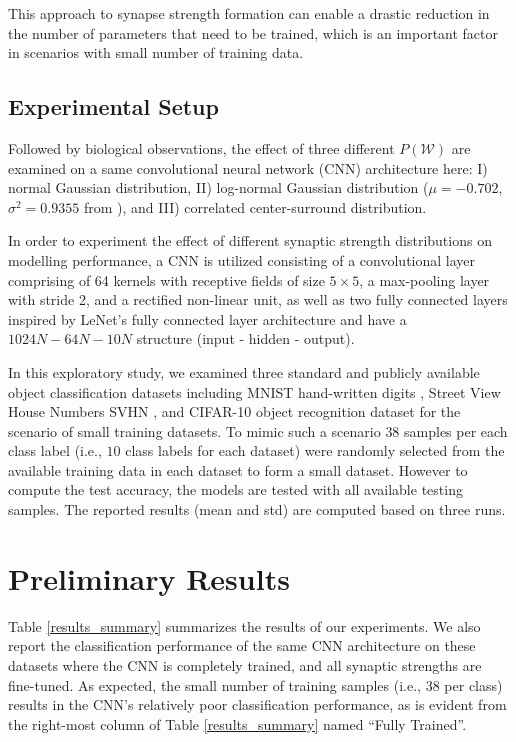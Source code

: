 \documentclass[10pt,letterpaper]{article}
\begin{document}
This approach to synapse strength formation can enable a drastic reduction in the number of parameters that need to be trained, which is an important factor in scenarios with small number of training data.

\subsection{Experimental Setup}

Followed by biological observations, the effect of three different $P(\mathcal{W})$ are examined on a same convolutional neural network (CNN) architecture here: I) normal Gaussian distribution, II) log-normal Gaussian distribution (\mbox{$\mu = - 0.702$}, \mbox{$\sigma^2 = 0.9355$} from \cite{song2005highly}), and III) correlated center-surround distribution.

In order to experiment the effect of different synaptic strength distributions on modelling performance, a CNN is utilized consisting of a convolutional layer comprising of 64 kernels with receptive fields of size $5 \times 5$, a max-pooling layer with stride 2, and a rectified non-linear unit, as well as two fully connected layers inspired by LeNet's fully connected layer architecture \cite{MNIST} and have a $1024N - 64N - 10N$ structure (input - hidden - output).

In this exploratory study, we examined three standard and publicly available object classification datasets including MNIST hand-written digits \cite{MNIST}, Street View House Numbers SVHN \cite{SVHN}, and CIFAR-10 object recognition dataset \cite{CIFAR-10} for the scenario of small training datasets. To mimic such a scenario $38$ samples per each class label (i.e., $10$ class labels for each dataset) were randomly selected from the available training data in each dataset to form a small dataset. However to compute the test accuracy, the models are tested with  all available testing samples. The reported results (mean and std) are computed based on three runs.

\vspace{-1.5mm}
\section{Preliminary Results}
Table \ref{results_summary} summarizes the results of our experiments. We also report the classification performance of the same CNN architecture on these datasets where the CNN is completely trained, and all synaptic strengths are fine-tuned. As expected, the small number of training samples (i.e., $38$ per class) results in the CNN's relatively poor classification performance, as is evident from the right-most column of Table \ref{results_summary} named ``Fully Trained''.
\end{document}
